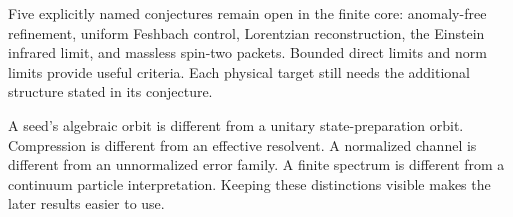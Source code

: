 \documentclass[11pt,letterpaper]{article}
\theoremstyle{definition}
\theoremstyle{remark}
\begin{document}
Five explicitly named conjectures remain open in the finite core: anomaly-free refinement, uniform Feshbach control, Lorentzian reconstruction, the Einstein infrared limit, and massless spin-two packets. Bounded direct limits and norm limits provide useful criteria. Each physical target still needs the additional structure stated in its conjecture.

\begin{keyidea}[title={Four distinctions to keep in view}]
A seed's algebraic orbit is different from a unitary state-preparation orbit. Compression is different from an effective resolvent. A normalized channel is different from an unnormalized error family. A finite spectrum is different from a continuum particle interpretation. Keeping these distinctions visible makes the later results easier to use.
\end{keyidea}
\end{document}

